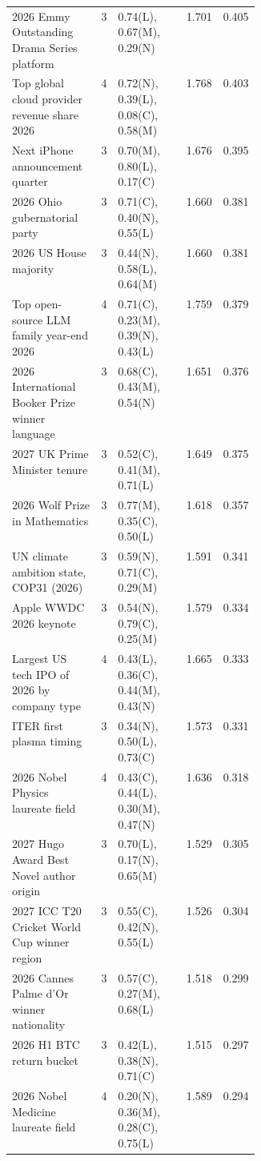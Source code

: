 \begin{longtable}{p{0.36\linewidth} c l r r}
2026 Emmy Outstanding Drama Series platform & 3 & \scriptsize 0.74(L), 0.67(M), 0.29(N) & 1.701 & 0.405 \\
Top global cloud provider revenue share 2026 & 4 & \scriptsize 0.72(N), 0.39(L), 0.08(C), 0.58(M) & 1.768 & 0.403 \\
Next iPhone announcement quarter & 3 & \scriptsize 0.70(M), 0.80(L), 0.17(C) & 1.676 & 0.395 \\
2026 Ohio gubernatorial party & 3 & \scriptsize 0.71(C), 0.40(N), 0.55(L) & 1.660 & 0.381 \\
2026 US House majority & 3 & \scriptsize 0.44(N), 0.58(L), 0.64(M) & 1.660 & 0.381 \\
Top open-source LLM family year-end 2026 & 4 & \scriptsize 0.71(C), 0.23(M), 0.39(N), 0.43(L) & 1.759 & 0.379 \\
2026 International Booker Prize winner language & 3 & \scriptsize 0.68(C), 0.43(M), 0.54(N) & 1.651 & 0.376 \\
2027 UK Prime Minister tenure & 3 & \scriptsize 0.52(C), 0.41(M), 0.71(L) & 1.649 & 0.375 \\
2026 Wolf Prize in Mathematics & 3 & \scriptsize 0.77(M), 0.35(C), 0.50(L) & 1.618 & 0.357 \\
UN climate ambition state, COP31 (2026) & 3 & \scriptsize 0.59(N), 0.71(C), 0.29(M) & 1.591 & 0.341 \\
Apple WWDC 2026 keynote & 3 & \scriptsize 0.54(N), 0.79(C), 0.25(M) & 1.579 & 0.334 \\
Largest US tech IPO of 2026 by company type & 4 & \scriptsize 0.43(L), 0.36(C), 0.44(M), 0.43(N) & 1.665 & 0.333 \\
ITER first plasma timing & 3 & \scriptsize 0.34(N), 0.50(L), 0.73(C) & 1.573 & 0.331 \\
2026 Nobel Physics laureate field & 4 & \scriptsize 0.43(C), 0.44(L), 0.30(M), 0.47(N) & 1.636 & 0.318 \\
2027 Hugo Award Best Novel author origin & 3 & \scriptsize 0.70(L), 0.17(N), 0.65(M) & 1.529 & 0.305 \\
2027 ICC T20 Cricket World Cup winner region & 3 & \scriptsize 0.55(C), 0.42(N), 0.55(L) & 1.526 & 0.304 \\
2026 Cannes Palme d'Or winner nationality & 3 & \scriptsize 0.57(C), 0.27(M), 0.68(L) & 1.518 & 0.299 \\
2026 H1 BTC return bucket & 3 & \scriptsize 0.42(L), 0.38(N), 0.71(C) & 1.515 & 0.297 \\
2026 Nobel Medicine laureate field & 4 & \scriptsize 0.20(N), 0.36(M), 0.28(C), 0.75(L) & 1.589 & 0.294 \\

\end{longtable}
